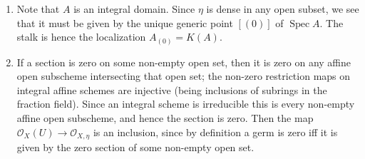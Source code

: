 \documentclass{report}
\renewcommand{\O}{\mathscr{O}} %
\DeclareMathOperator{\Spec}{Spec}
\begin{document}
\begin{enumerate}[label=\textbf{5.2.\Alph*.}]
	\item Note that $A$ is an integral domain. Since $\eta$ is dense in any open
	      subset, we see that it must be given by the unique generic point $[(0)]$
	      of $\Spec A$. The stalk is hence the localization $A_{(0)}=K(A)$.

	\item If a section is zero on some non-empty open set, then it is zero on
	      any affine open subscheme intersecting that open set; the non-zero
	      restriction maps on integral affine schemes are injective (being
	      inclusions of subrings in the fraction field). Since an integral scheme
	      is irreducible this is every non-empty affine open subscheme, and hence
	      the section is zero. Then the map $\O_X(U)\to\O_{X,\eta}$ is an
	      inclusion, since by definition a germ is zero iff it is given by the
	      zero section of some non-empty open set.
\end{enumerate}
\end{document}
